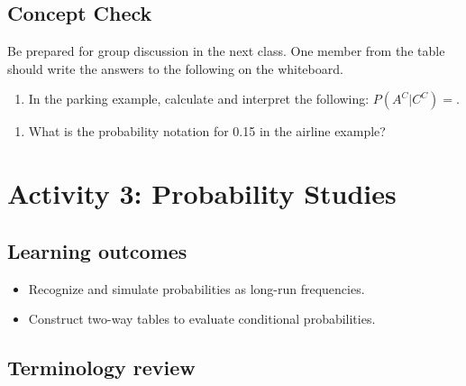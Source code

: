 \documentclass[
]{report}
\providecommand{\tightlist}{%
  \setlength{\itemsep}{0pt}\setlength{\parskip}{0pt}}
\begin{document}
\vspace{1in}

\subsection{Concept Check}\label{concept-check-1}

Be prepared for group discussion in the next class. One member from the table should write the answers to the following on the whiteboard.

\begin{enumerate}
\def\labelenumi{\arabic{enumi}.}
\tightlist
\item
  In the parking example, calculate and interpret the following: \(P(A^C|C^C)=\).
\end{enumerate}

\vspace{1in}

\begin{enumerate}
\def\labelenumi{\arabic{enumi}.}
\setcounter{enumi}{1}
\tightlist
\item
  What is the probability notation for 0.15 in the airline example?
\end{enumerate}

\vspace{1in}

\newpage

\section{Activity 3: Probability Studies}\label{activity-3-probability-studies}


\subsection{Learning outcomes}\label{learning-outcomes-2}

\begin{itemize}
\item
  Recognize and simulate probabilities as long-run frequencies.
\item
  Construct two-way tables to evaluate conditional probabilities.
\end{itemize}

\subsection{Terminology review}\label{terminology-review-2}
\end{document}

